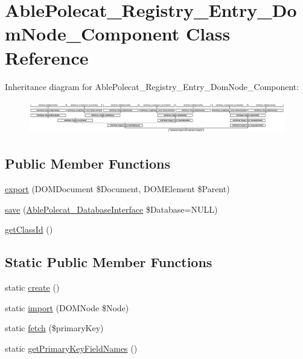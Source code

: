 \hypertarget{class_able_polecat___registry___entry___dom_node___component}{}\section{Able\+Polecat\+\_\+\+Registry\+\_\+\+Entry\+\_\+\+Dom\+Node\+\_\+\+Component Class Reference}
\label{class_able_polecat___registry___entry___dom_node___component}
Inheritance diagram for Able\+Polecat\+\_\+\+Registry\+\_\+\+Entry\+\_\+\+Dom\+Node\+\_\+\+Component\+:\begin{figure}[H]
\begin{center}
\leavevmode
\includegraphics[height=1.463415cm]{class_able_polecat___registry___entry___dom_node___component}
\end{center}
\end{figure}
\subsection*{Public Member Functions}
\begin{DoxyCompactItemize}
\item 
\hyperlink{class_able_polecat___registry___entry___dom_node___component_a0a05b2e4b3a44390eeb042064e427b1a}{export} (D\+O\+M\+Document \$Document, D\+O\+M\+Element \$Parent)
\item 
\hyperlink{class_able_polecat___registry___entry___dom_node___component_a999eef977eb899167ae02f83dd26a4ae}{save} (\hyperlink{interface_able_polecat___database_interface}{Able\+Polecat\+\_\+\+Database\+Interface} \$Database=N\+U\+L\+L)
\item 
\hyperlink{class_able_polecat___registry___entry___dom_node___component_acc9039051a8b6d4fe7c5ddfbaedbcbcb}{get\+Class\+Id} ()
\end{DoxyCompactItemize}
\subsection*{Static Public Member Functions}
\begin{DoxyCompactItemize}
\item 
static \hyperlink{class_able_polecat___registry___entry___dom_node___component_a239b1c70258014a86569483c2d009de6}{create} ()
\item 
static \hyperlink{class_able_polecat___registry___entry___dom_node___component_aa44a46592f08e874ef793aee209ada30}{import} (D\+O\+M\+Node \$Node)
\item 
static \hyperlink{class_able_polecat___registry___entry___dom_node___component_a363352ee6a773e5aae4ea3efbc0fa753}{fetch} (\$primary\+Key)
\item 
static \hyperlink{class_able_polecat___registry___entry___dom_node___component_a421b5f1cf6301568ecc2f572537f0b90}{get\+Primary\+Key\+Field\+Names} ()
\end{DoxyCompactItemize}
